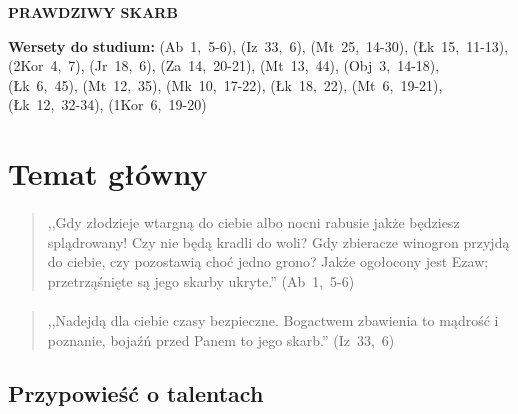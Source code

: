 \documentclass[10pt,a4paper,oneside]{article}
\begin{document}
\centerline{\textbf{\MakeUppercase{Prawdziwy skarb}}}
\begin{center}
\textbf{Wersety do studium:} \mbox{(Ab 1, 5-6)}, \mbox{(Iz 33, 6)}, \mbox{(Mt 25, 14-30)}, \mbox{(Łk 15, 11-13)}, \mbox{(2Kor 4, 7)}, \mbox{(Jr 18, 6)}, \mbox{(Za 14, 20-21)}, \mbox{(Mt 13, 44)}, \mbox{(Obj 3, 14-18)}, \mbox{(Łk 6, 45)}, \mbox{(Mt 12, 35)}, \mbox{(Mk 10, 17-22)}, \mbox{(Łk 18, 22)}, \mbox{(Mt 6, 19-21)}, \mbox{(Łk 12, 32-34)}, \mbox{(1Kor 6, 19-20)}
\end{center}
\section{Temat główny}
\paragraph{}
\begin{quote}
,,Gdy złodzieje wtargną do ciebie albo nocni rabusie jakże będziesz splądrowany! Czy nie będą kradli do woli? Gdy zbieracze winogron przyjdą do ciebie, czy pozostawią choć jedno grono? Jakże ogołocony jest Ezaw; przetrząśnięte są jego skarby ukryte.'' \mbox{(Ab 1, 5-6)}
\end{quote}
\paragraph{}
\begin{quote}
,,Nadejdą dla ciebie czasy bezpieczne. Bogactwem zbawienia to mądrość i poznanie, bojaźń przed Panem to jego skarb.'' \mbox{(Iz 33, 6)}
\end{quote}
\subsection{Przypowieść o talentach}
\end{document}
